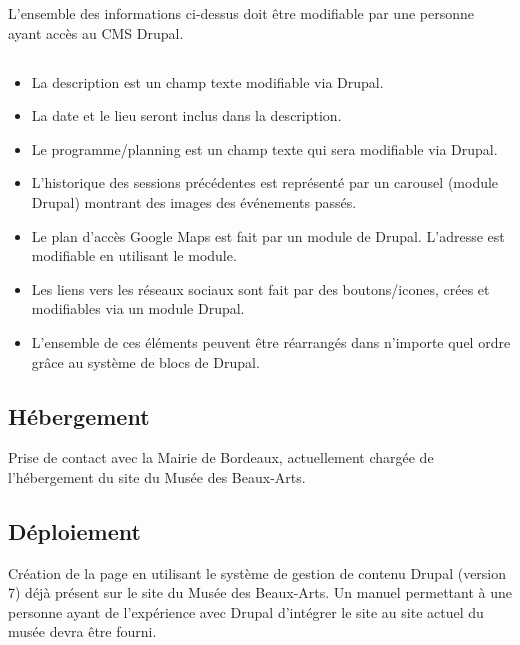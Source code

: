 \documentclass[11pt]{report}
\begin{document}
\vspace{0.5cm}

L'ensemble des informations ci-dessus doit être modifiable par une personne
ayant accès au CMS Drupal. \\

\subsection*{}
\begin{itemize}
	\item La description est un champ texte modifiable via Drupal.
	\item La date et le lieu seront inclus dans la description.
	\item Le programme/planning est un champ texte qui sera modifiable via Drupal.
	\item L'historique des sessions précédentes est représenté par un carousel
	(module Drupal) montrant des images des événements passés.
	\item Le plan d'accès Google Maps est fait par un module de Drupal.
	L'adresse est modifiable en utilisant le module.
	\item Les liens vers les réseaux sociaux sont fait par des boutons/icones,
	crées et modifiables via un module Drupal.
	\item L'ensemble de ces éléments peuvent être réarrangés dans n'importe quel ordre grâce au système de blocs de Drupal.
\end{itemize}

\subsection*{Hébergement}
Prise de contact avec la Mairie de Bordeaux, actuellement chargée de
l'hébergement du site du Musée des Beaux-Arts.

\subsection*{Déploiement}
Création de la page en utilisant le système de gestion de contenu Drupal
(version 7) déjà présent sur le site du Musée des Beaux-Arts.
Un manuel permettant à une personne ayant de l'expérience avec Drupal
d'intégrer le site au site actuel du musée devra être fourni.

\end{document}
